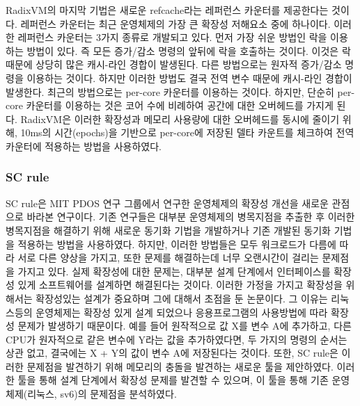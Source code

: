 RadixVM의 마지막 기법은 새로운 refcache라는 레퍼런스 카운터를 제공한다는 것이다.
레퍼런스 카운터는 최근 운영체제의 가장 큰 확장성 저해요소 중에 하나이다.
이러한 레퍼런스 카운터는 3가지 종류로 개발되고 있다. 먼저 가장 쉬운 방법인 락을 
이용하는 방법이 있다. 즉 모든 증가/감소 명령의 앞뒤에 락을 호출하는 것이다. 
이것은 락 때문에 상당히 많은 캐시-라인 경합이 발생된다. 
다른 방법으로는 원자적 증가/감소 명령을 이용하는 것이다. 하지만 이러한 방법도 결국 
전역 변수 때문에 캐시-라인 경합이 발생한다. 
최근의 방법으로는 per-core 카운터를 이용하는 것이다. 
하지만, 단순히 per-core 카운터를 이용하는 것은 코어 수에 비례하여 공간에 대한 오버헤드를 가지게 된다.
RadixVM은 이러한 확장성과 메모리 사용량에 대한 오버헤드를 동시에 줄이기 위해, 
10ms의 시간(epochs)을 기반으로 per-core에 저장된 델타 카운트를 
체크하여 전역 카운터에 적용하는 방법을 사용하였다.

\subsubsection{SC rule}

SC rule은 MIT  PDOS 연구 그룹에서 연구한 운영체제의 확장성 개선을 새로운 관점으로 바라본 연구이다. 
기존 연구들은 대부분 운영체제의 병목지점을 추출한 후 이러한 병목지점을 해결하기 위해 새로운 
동기화 기법을 개발하거나 기존 개발된 동기화 기법을 적용하는 방법을 사용하였다. 하지만, 이러한 방법들은 
모두 워크로드가 다름에 따라 서로 다른 양상을 가지고, 
또한 문제를 해결하는데 너무 오랜시간이 걸리는 문제점을 가지고 있다.
실제 확장성에 대한 문제는, 대부분 설계 단계에서 인터페이스를 확장성 있게 소프트웨어를 설계하면 해결된다는 것이다. 
이러한 가정을 가지고 확장성을 위해서는 확장성있는 설계가 중요하며 그에 대해서 초점을 둔 논문이다.
그 이유는 리눅스등의 운영체제는 확장성 있게 설계 되었으나 응용프로그램의 사용방법에 따라 확장성 문제가 발생하기 
때문이다.
예를 들어 원작적으로 값 X를 변수 A에 추가하고, 다른 CPU가 원자적으로 같은 변수에 Y라는 값을 추가하였다면, 
두 가지의 명령의 순서는 상관 없고, 결국에는 X + Y의 값이 변수 A에 저장된다는 것이다.
또한, SC rule은 이러한 문제점을 발견하기 위해 메모리의 충돌을 발견하는 새로운 툴을 제안하였다. 
이러한 툴을 통해 설계 단계에서 확장성 문제를 발견할 수 있으며, 이 툴을 통해 기존 운영체제(리눅스, sv6)의 
문제점을 분석하였다. 

